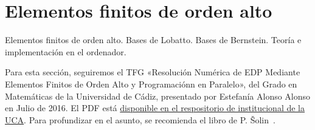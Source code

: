 \section{Elementos finitos de orden alto}

\begin{contenidos}
  Elementos finitos de orden alto. Bases de Lobatto. Bases de
  Bernstein. Teoría e implementación en el ordenador.
\end{contenidos}


Para esta sección, seguiremos el TFG «Resolución Numérica de EDP
Mediante Elementos Finitos de Orden Alto y Programaciónn en Paralelo»,
del Grado en Matemáticas de la Universidad de Cádiz, presentado por
Estefanía Alonso Alonso en Julio de 2016. El PDF está
\href{https://rodin.uca.es/xmlui/bitstream/handle/10498/19255/TFG-EstefaniaAlonso.pdf}{disponible
  en el respositorio de institucional de la UCA}.
Para profundizar en el asunto, se recomienda el libro de P. \v{S}olin~\cite{solin_higher-order_2004}.

